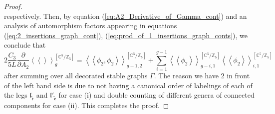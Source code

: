 \documentclass[10pt,a4paper]{amsart}
\begin{document}
\begin{proof}
\begin{equation*}
\end{equation*}
respectively. Then, by equation (\ref{eq:A2_Derivative_of_Gamma_cont}) and an analysis of automorphism factors appearing in equations (\ref{eq:2_insertions_graph_cont}), (\ref{eq:prod_of_1_insertions_graph_conts}), we conclude that
\begin{equation*}
2\frac{C_{3}}{5L}\frac{\partial}{\partial A_2}\left\langle\left\langle\right\rangle\right\rangle_{g}^{\left[\mathbb{C}^5 / \mathbb{Z}_5\right]}
=\left\langle\left\langle\phi_{2},\phi_{2}\right\rangle\right\rangle_{g-1,2}^{\left[\mathbb{C}^5 / \mathbb{Z}_5\right]}+\sum_{i=1}^{g-1}\left\langle\left\langle\phi_{2}\right\rangle\right\rangle_{g-i,1}^{\left[\mathbb{C}^5 / \mathbb{Z}_5\right]}\left\langle\left\langle\phi_{2}\right\rangle\right\rangle_{i,1}^{\left[\mathbb{C}^5 / \mathbb{Z}_5\right]}
\end{equation*}
after summing over all decorated stable graphs $\Gamma$. The reason we have $2$ in front of the left hand side is due to not having a canonical order of labelings of each of the legs $\mathfrak{l}_{\tilde{\mathfrak{e}}}$ and $\mathfrak{l}'_{\tilde{\mathfrak{e}}}$ for case (i) and double counting  of different genera of connected components for case (ii). This completes the proof. 
\end{proof}
\end{document}
